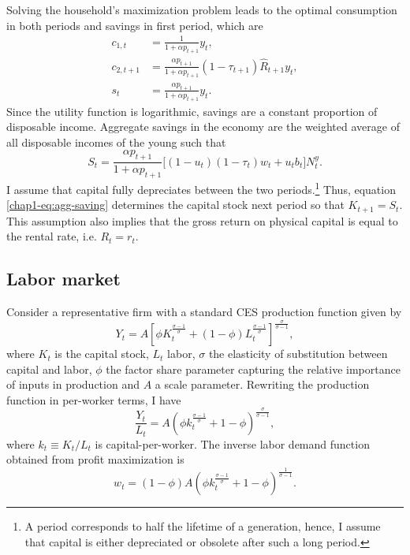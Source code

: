 Solving the household's maximization problem leads to the optimal consumption in both periods and savings in first period, which are
\begin{align}
	c_{1,t} &= \frac{1}{1+\alpha p_{t+1}} y_{t}, \label{chap1-eq:hhmaxc1}\\
	c_{2,t+1} &= \frac{\alpha p_{t+1}}{1+\alpha p_{t+1}}(1-\tau_{t+1})\hat{R}_{t+1}y_{t}, \label{chap1-eq:hhmaxc2}\\
	s_t &= \frac{\alpha p_{t+1}}{1+\alpha p_{t+1}} y_t. \label{chap1-eq:hhmaxs}
\end{align}
Since the utility function is logarithmic, savings are a constant proportion of disposable income. Aggregate savings in the economy are the weighted average of all disposable incomes of the young such that
\begin{equation}\label{chap1-eq:agg-saving}
	S_t = \frac{\alpha p_{t+1}}{1+\alpha p_{t+1}}\Big[(1-u_t)(1-\tau_t)w_t + u_t b_t\Big] N_t^y.
\end{equation}
I assume that capital fully depreciates between the two periods.\footnote{A period corresponds to half the lifetime of a generation, hence, I assume that capital is either depreciated or obsolete after such a long period.} Thus, equation \eqref{chap1-eq:agg-saving} determines the capital stock next period so that $K_{t+1} = S_t$. This assumption also implies that the gross return on physical capital is equal to the rental rate, i.e. $R_t = r_t$. 

\subsection{Labor market}\label{chap1-labor-market}

Consider a representative firm with a standard CES production function given by
\begin{equation}\label{chap1-eq:prod}
	Y_t = A\left[ \phi K_t^{\frac{\sigma - 1}{\sigma}} + (1-\phi) L_t^{\frac{\sigma - 1}{\sigma}}\right]^{\frac{\sigma}{\sigma-1}},
\end{equation}
where $K_t$ is the capital stock, $L_t$ labor, $\sigma$ the elasticity of substitution between capital and labor, $\phi$ the factor share parameter capturing the relative importance of inputs in production and $A$ a scale parameter. 
Rewriting the production function in per-worker terms, I have
\begin{equation}\label{chap1-eq:prod/L}
	\frac{Y_t}{L_t} = A\left(\phi k_t^{\frac{\sigma-1}{\sigma}} + 1-\phi\right)^{\frac{\sigma}{\sigma-1}},
\end{equation}
where $k_t\equiv K_t/L_t$ is capital-per-worker.
The inverse labor demand function obtained from profit maximization is
\begin{equation}\label{chap1-eq:labor-demand}
	w_t = (1-\phi)A\left(\phi k_t^{\frac{\sigma-1}{\sigma}}+1-\phi\right)^{\frac{1}{\sigma-1}}.
\end{equation}

